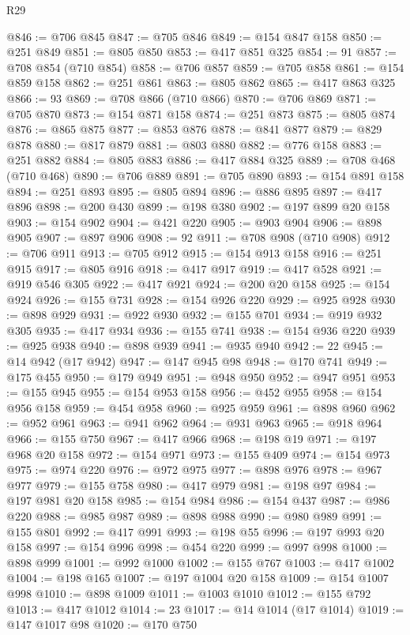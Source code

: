 \begin{lexlean}{R29}
\begin{coremodule}
@846 := @706 @845
@847 := @705 @846
@849 := @154 @847 @158
@850 := @251 @849
@851 := @805 @850
@853 := @417 @851 @325
@854 := 91
@857 := @708 @854 (@710 @854)
@858 := @706 @857
@859 := @705 @858
@861 := @154 @859 @158
@862 := @251 @861
@863 := @805 @862
@865 := @417 @863 @325
@866 := 93
@869 := @708 @866 (@710 @866)
@870 := @706 @869
@871 := @705 @870
@873 := @154 @871 @158
@874 := @251 @873
@875 := @805 @874
@876 := @865 @875
@877 := @853 @876
@878 := @841 @877
@879 := @829 @878
@880 := @817 @879
@881 := @803 @880
@882 := @776 @158
@883 := @251 @882
@884 := @805 @883
@886 := @417 @884 @325
@889 := @708 @468 (@710 @468)
@890 := @706 @889
@891 := @705 @890
@893 := @154 @891 @158
@894 := @251 @893
@895 := @805 @894
@896 := @886 @895
@897 := @417 @896
@898 := @200 @430
@899 := @198 @380
@902 := @197 @899 @20 @158
@903 := @154 @902
@904 := @421 @220
@905 := @903 @904
@906 := @898 @905
@907 := @897 @906
@908 := 92
@911 := @708 @908 (@710 @908)
@912 := @706 @911
@913 := @705 @912
@915 := @154 @913 @158
@916 := @251 @915
@917 := @805 @916
@918 := @417 @917
@919 := @417 @528
@921 := @919 @546 @305
@922 := @417 @921
@924 := @200 @20 @158
@925 := @154 @924
@926 := @155 @731
@928 := @154 @926 @220
@929 := @925 @928
@930 := @898 @929
@931 := @922 @930
@932 := @155 @701
@934 := @919 @932 @305
@935 := @417 @934
@936 := @155 @741
@938 := @154 @936 @220
@939 := @925 @938
@940 := @898 @939
@941 := @935 @940
@942 := 22
@945 := @14 @942 (@17 @942)
@947 := @147 @945 @98
@948 := @170 @741
@949 := @175 @455
@950 := @179 @949
@951 := @948 @950
@952 := @947 @951
@953 := @155 @945
@955 := @154 @953 @158
@956 := @452 @955
@958 := @154 @956 @158
@959 := @454 @958
@960 := @925 @959
@961 := @898 @960
@962 := @952 @961
@963 := @941 @962
@964 := @931 @963
@965 := @918 @964
@966 := @155 @750
@967 := @417 @966
@968 := @198 @19
@971 := @197 @968 @20 @158
@972 := @154 @971
@973 := @155 @409
@974 := @154 @973
@975 := @974 @220
@976 := @972 @975
@977 := @898 @976
@978 := @967 @977
@979 := @155 @758
@980 := @417 @979
@981 := @198 @97
@984 := @197 @981 @20 @158
@985 := @154 @984
@986 := @154 @437
@987 := @986 @220
@988 := @985 @987
@989 := @898 @988
@990 := @980 @989
@991 := @155 @801
@992 := @417 @991
@993 := @198 @55
@996 := @197 @993 @20 @158
@997 := @154 @996
@998 := @454 @220
@999 := @997 @998
@1000 := @898 @999
@1001 := @992 @1000
@1002 := @155 @767
@1003 := @417 @1002
@1004 := @198 @165
@1007 := @197 @1004 @20 @158
@1009 := @154 @1007 @998
@1010 := @898 @1009
@1011 := @1003 @1010
@1012 := @155 @792
@1013 := @417 @1012
@1014 := 23
@1017 := @14 @1014 (@17 @1014)
@1019 := @147 @1017 @98
@1020 := @170 @750

\end{coremodule}
\end{lexlean}
